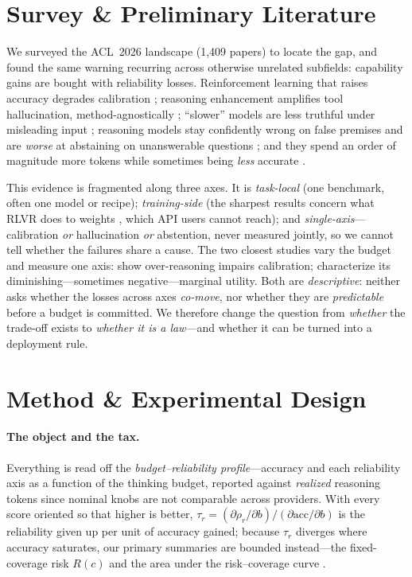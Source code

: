 \documentclass[11pt]{article}
\begin{document}
\section{Survey \& Preliminary Literature}
We surveyed the ACL~2026 landscape (1{,}409 papers) to locate the gap, and
found the same warning recurring across otherwise unrelated subfields:
capability gains are bought with reliability losses. Reinforcement learning
that raises accuracy degrades calibration \citep{Wang2026CAPO,Jin2025Entropy};
reasoning enhancement amplifies tool hallucination, method-agnostically
\citep{Yin2025ReasoningTrap}; ``slower'' models are less truthful under
misleading input \citep{Fang2025Slower}; reasoning models stay confidently
wrong on false premises \citep{Sathyanathan2025Presuppositions} and are
\emph{worse} at abstaining on unanswerable questions
\citep{Kirichenko2025AbstentionBench}; and they spend an order of magnitude more
tokens while sometimes being \emph{less} accurate
\citep{Srivastava2025Overthink,Shojaee2025IllusionThinking}.

This evidence is fragmented along three axes. It is \emph{task-local} (one
benchmark, often one model or recipe); \emph{training-side} (the sharpest
results concern what RLVR does to weights \citep{Yue2025RLBeyondBase,
Zhao2025SpuriousRewards}, which API users cannot reach); and
\emph{single-axis}---calibration \emph{or} hallucination \emph{or} abstention,
never measured jointly, so we cannot tell whether the failures share a cause.
The two closest studies vary the budget and measure one axis:
\citet{DontThinkTwice2025} show over-reasoning impairs calibration;
\citet{WhenMoreThinkingHurts2026} characterize its diminishing---sometimes
negative---marginal utility. Both are \emph{descriptive}: neither asks whether
the losses across axes \emph{co-move}, nor whether they are \emph{predictable}
before a budget is committed. We therefore change the question from
\emph{whether} the trade-off exists to \emph{whether it is a law}---and whether
it can be turned into a deployment rule.

\section{Method \& Experimental Design}
\paragraph{The object and the tax.} Everything is read off the
\emph{budget--reliability profile}---accuracy and each reliability axis as a
function of the thinking budget, reported against \emph{realized} reasoning
tokens since nominal knobs are not comparable across providers. With every score
oriented so that higher is better,
$\tau_r=(\partial\rho_r/\partial b)/(\partial \mathrm{acc}/\partial b)$ is the
reliability given up per unit of accuracy gained; because $\tau_r$ diverges
where accuracy saturates, our primary summaries are bounded instead---the
fixed-coverage risk $R(c)$ and the area under the risk--coverage curve
\citep{Geifman2017Selective}.
\end{document}
